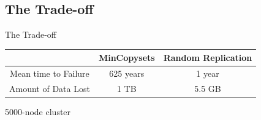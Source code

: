 \documentclass[xcolor=table]{beamer}
\begin{document}
	\subsection{The Trade-off}
	\begin{frame}{The Trade-off}
		\begin{table}[h]
			\begin{tabular}{|c|c|c|}
				\hline
				\rowcolor[HTML]{3B9CF0} 
					& MinCopysets & Random Replication \\ \hline
				\rowcolor[HTML]{00D2CB} 
				Mean time to Failure & 625 years   & 1 year             \\ \hline
				\rowcolor[HTML]{00D2CB} 
				Amount of Data Lost  & 1 TB        & 5.5 GB             \\ \hline
			\end{tabular}
		\end{table}
		\begin{center}
			5000-node cluster
		\end{center}
	\end{frame}
\end{document}
